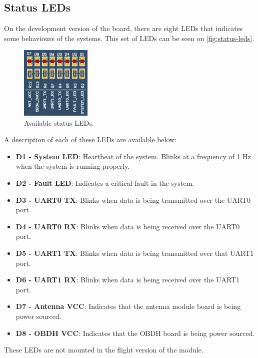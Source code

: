 \subsection{Status LEDs} \label{sec:status-leds}

On the development version of the board, there are eight LEDs that indicates some behaviours of the systems. This set of LEDs can be seen on \autoref{fig:status-leds}.

\begin{figure}[!ht]
    \begin{center}
        \includegraphics[width=0.3\textwidth]{figures/status_leds.png}
        \caption{Available status LEDs.}
        \label{fig:status-leds}
    \end{center}
\end{figure}

A description of each of these LEDs are available below:

\begin{itemize}
    \item \textbf{D1 - System LED}: Heartbeat of the system. Blinks at a frequency of 1 Hz when the system is running properly.
    \item \textbf{D2 - Fault LED}: Indicates a critical fault in the system.
    \item \textbf{D3 - UART0 TX}: Blinks when data is being transmitted over the UART0 port.
    \item \textbf{D4 - UART0 RX}: Blinks when data is being received over the UART0 port.
    \item \textbf{D5 - UART1 TX}: Blinks when data is being transmitted over that UART1 port.
    \item \textbf{D6 - UART1 RX}: Blinks when data is being received over the UART1 port.
    \item \textbf{D7 - Antenna VCC}: Indicates that the antenna module board is being power sourced.
    \item \textbf{D8 - OBDH VCC}: Indicates that the OBDH board is being power sourced.
\end{itemize}

These LEDs are not mounted in the flight version of the module.
